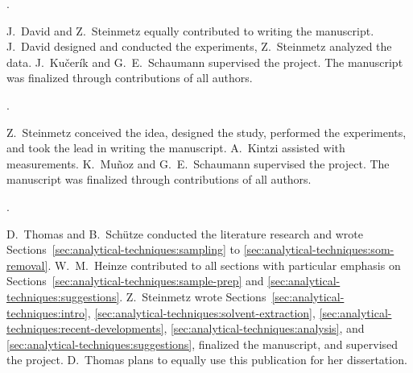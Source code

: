 \vspace{0.5\baselineskip}
\noindent{}.

\begin{description}
	\setlength\itemsep{0em}
	\item[Author contributions:] J.~David and Z.~Steinmetz equally contributed to writing the manuscript. J.~David designed and conducted the experiments, Z.~Steinmetz analyzed the data. J.~Kučerík and G.~E.~Schaumann supervised the project. The manuscript was finalized through contributions of all authors.
\end{description}

\vspace{0.5\baselineskip}
\noindent{}.

\begin{description}
	\setlength\itemsep{0em}
	\item[Author contributions:] Z.~Steinmetz conceived the idea, designed the study, performed the experiments, and took the lead in writing the manuscript. A.~Kintzi assisted with measurements. K.~Muñoz and G.~E.~Schaumann supervised the project. The manuscript was finalized through contributions of all authors.
\end{description}

\vspace{0.5\baselineskip}
\noindent{}.

\begin{description}
	\setlength\itemsep{0em}
	\item[Author contributions:] D.~Thomas and B.~Schütze conducted the literature research and wrote Sections~\ref{sec:analytical-techniques:sampling} to \ref{sec:analytical-techniques:som-removal}. W.~M.~Heinze contributed to all sections with particular emphasis on Sections~\ref{sec:analytical-techniques:sample-prep} and \ref{sec:analytical-techniques:suggestions}. Z.~Steinmetz wrote Sections~\ref{sec:analytical-techniques:intro}, \ref{sec:analytical-techniques:solvent-extraction}, \ref{sec:analytical-techniques:recent-developments}, \ref{sec:analytical-techniques:analysis}, and \ref{sec:analytical-techniques:suggestions}, finalized the manuscript, and supervised the project. D.~Thomas plans to equally use this publication for her dissertation.
\end{description}

